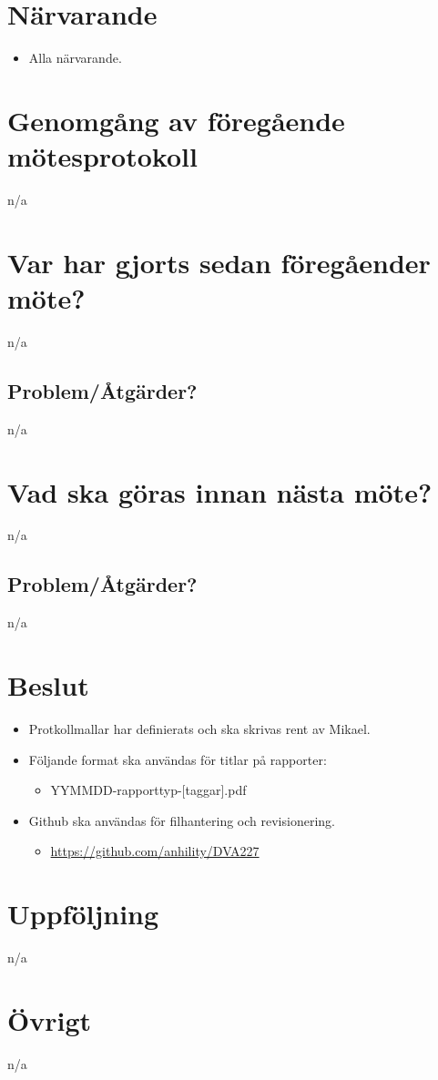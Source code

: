 \section*{Närvarande}
\begin{itemize}
    \itemsep0em
    \item Alla närvarande.
\end{itemize}

\section*{Genomgång av föregående mötesprotokoll}
n/a

\section*{Var har gjorts sedan föregåender möte?}
n/a

\subsection*{Problem/Åtgärder?}
n/a

\section*{Vad ska göras innan nästa möte?}
n/a

\subsection*{Problem/Åtgärder?}
n/a

\section*{Beslut}
\begin{itemize}
    \itemsep0em
    \item Protkollmallar har definierats och ska skrivas rent av Mikael.
    \item Följande format ska användas för titlar på rapporter:
    \begin{itemize}
        \itemsep0em
        \item YYMMDD-rapporttyp-[taggar].pdf
    \end{itemize}
    \item Github ska användas för filhantering och revisionering.
    \begin{itemize}
        \itemsep0em
        \item \url{https://github.com/anhility/DVA227}
    \end{itemize}
\end{itemize}

\section*{Uppföljning}
n/a

\section*{Övrigt}
n/a